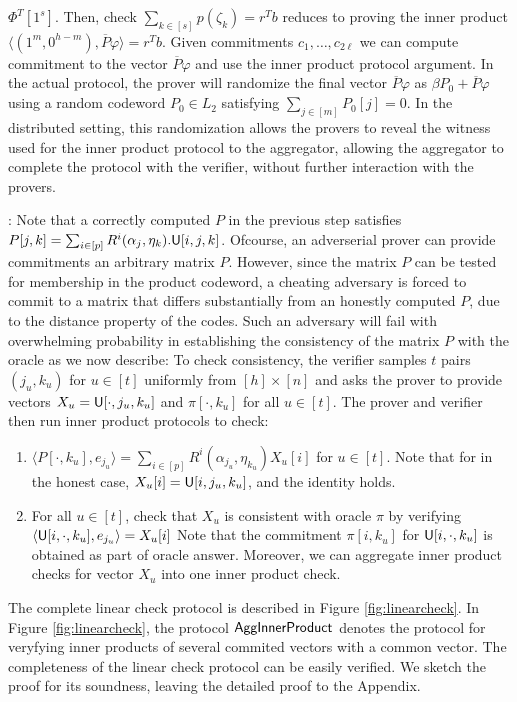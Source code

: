 $\Phi^T[1^s]$. Then, check $\sum_{k\in [s]}p(\zeta_k)=r^Tb$ reduces to
proving the inner product $\langle (1^m,0^{h-m}),\overline{P}\varphi\rangle=r^Tb$. Given
commitments $c_1,\ldots,c_{2\ell}$ we can compute commitment to the vector
$\overline{P}\varphi$ and use the inner product protocol argument.
In the actual protocol, the prover will randomize
the final vector $\overline{P}\varphi$ as $\beta P_0 + \overline{P}\varphi$ using a random codeword
 $P_0\in L_2$ satisfying $\sum_{j\in [m]} P_0[j]=0$. In the distributed setting, this 
randomization allows the provers to reveal the witness used for the inner product protocol to the aggregator, allowing the aggregator to complete the protocol with the verifier, without 
further interaction with the provers.

: Note that a correctly computed
$P$ in the previous step satisfies $P[j,k]=\sum_{i\in
[p]}R^i(\alpha_j,\eta_k).\mathsf{U}[i,j,k]$. Ofcourse, an adverserial prover can provide commitments
an arbitrary matrix $P$. However, since the matrix $P$ can be tested for membership in 
the product codeword, a cheating adversary is forced to commit to a matrix that differs 
substantially from an honestly computed $P$, due to the distance property of the codes. 
Such an adversary will fail with overwhelming probability in establishing the consistency of 
the matrix $P$ with the oracle as we now describe: To check consistency, the verifier 
samples $t$ pairs $(j_u,k_u)$ for $u\in
[t]$ uniformly from $[h]\times [n]$ and asks the prover to provide vectors
$X_u=\mathsf{U}[\cdot,j_u,k_u]$ and $\pi[\cdot,k_u]$ for all $u\in [t]$. The prover and
verifier then run inner product protocols to check:
\begin{enumerate}[{\rm (i)}]
\item $\langle P[\cdot,k_u], e_{j_u}\rangle=\sum_{i\in
[p]}R^i(\alpha_{j_u},\eta_{k_u})X_u[i]$ for $u\in [t]$. Note that for in the honest case, $X_u[i]=\mathsf{U}[i,j_u,k_u]$, and the identity holds.
\item For all $u\in [t]$, check  that $X_u$ is consistent with oracle $\pi$ by verifying
$\langle \mathsf{U}[i,\cdot,k_u],e_{j_u}\rangle=X_u[i]$  Note that the commitment
$\pi[i,k_u]$ for $\mathsf{U}[i,\cdot,k_u]$ is obtained as part of oracle answer. Moreover, we can aggregate inner product checks for vector $X_u$ into one inner product check.
\end{enumerate}
The complete linear check protocol is described in Figure \ref{fig:linearcheck}. 
In Figure \ref{fig:linearcheck}, the protocol $\mathsf{AggInnerProduct}$ denotes the protocol 
for veryfying inner products of several commited vectors with a common vector. 
The completeness of the linear check protocol can be easily verified. We sketch the proof for its
soundness, leaving the detailed proof to the Appendix.

